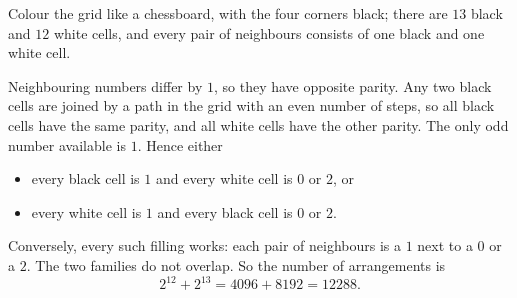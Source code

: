 Colour the grid like a chessboard, with the four corners black; there are $13$ black and $12$ white cells, and every pair of neighbours consists of one black and one white cell.

Neighbouring numbers differ by $1$, so they have opposite parity. Any two black cells are joined by a path in the grid with an even number of steps, so all black cells have the same parity, and all white cells have the other parity. The only odd number available is $1$. Hence either
\begin{itemize}
\item every black cell is $1$ and every white cell is $0$ or $2$, or
\item every white cell is $1$ and every black cell is $0$ or $2$.
\end{itemize}
Conversely, every such filling works: each pair of neighbours is a $1$ next to a $0$ or a $2$. The two families do not overlap. So the number of arrangements is
\[
2^{12}+2^{13}=4096+8192=\boxed{12288}.
\]
